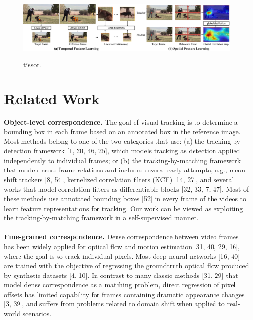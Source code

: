 \documentclass{article}
\begin{document}
\begin{figure}[!tb]
  \centering
  {\includegraphics[width=1.0\textwidth]{figure/tissor/tissor6.pdf}}
  \caption{\small tissor.}
  \label{fig:tissor}
  \vspace{-6mm}
\end{figure}

\section{Related Work}
\textbf{Object-level correspondence.} The goal of visual tracking is to determine a bounding box in each frame based on an annotated box in the reference image. Most methods belong to one of the two categories that use: (a) the tracking-by-detection framework [1, 20, 46, 25], which models tracking as detection applied independently to individual frames; or (b) the tracking-by-matching framework that models cross-frame relations and includes several early attempts, e.g., mean-shift trackers [8, 54], kernelized correlation filters (KCF) [14, 27], and several works that model correlation filters as differentiable blocks [32, 33, 7, 47]. Most of these methods use annotated bounding boxes [52] in every frame of the videos to learn feature representations for tracking. Our work can be viewed as exploiting the tracking-by-matching framework in a self-supervised manner. \\
\\
\textbf{Fine-grained correspondence.} Dense correspondence between video frames has been widely applied for optical flow and motion estimation [31, 40, 29, 16], where the goal is to track individual pixels. Most deep neural networks [16, 40] are trained with the objective of regressing the groundtruth optical flow produced by synthetic datasets [4, 10]. In contrast to many classic methods [31, 29] that model dense correspondence as a matching problem, direct regression of pixel offsets has limited capability for frames containing dramatic appearance changes [3, 39], and suffers from problems related to domain shift when applied to real-world scenarios.
\end{document}
